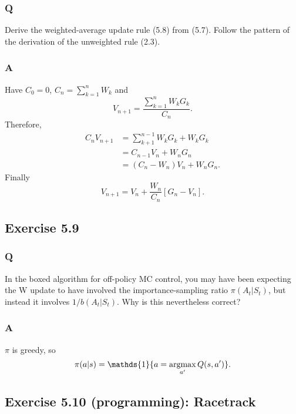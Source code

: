 \subsubsection*{Q}
Derive the weighted-average update rule (5.8) from (5.7). Follow the pattern of the derivation of the unweighted rule (2.3).

\subsubsection*{A}
Have $C_0 = 0$, $C_n = \sum_{k = 1}^n W_k$ and 
\[
    V_{n+1} = \frac{\sum_{k = 1}^n W_kG_k}{C_n}.
\]
Therefore,
\begin{align}
    C_n V_{n+1} &= \sum_{k+1}^{n-1}W_kG_k + W_kG_k\\
                &= C_{n-1}V_n + W_nG_n \\
                &= (C_n - W_n)V_n + W_nG_n.
\end{align}
Finally
\[
    V_{n+1} = V_n + \frac{W_n}{C_n}[G_n - V_n].
\]

\subsection{Exercise 5.9}
\subsubsection*{Q}
In the boxed algorithm for off-policy MC control, you may have been expecting the W update to have involved the importance-sampling ratio $\pi(A_t|S_t)$, but instead it involves $1/b(A_t|S_t)$. Why is this nevertheless correct?

\subsubsection*{A}
$\pi$ is greedy, so 
\[
    \pi(a | s) = \mathds{1}\{a = \argmax_{a'} Q(s, a')\}.
\]

\subsection{Exercise 5.10 (programming): Racetrack}
